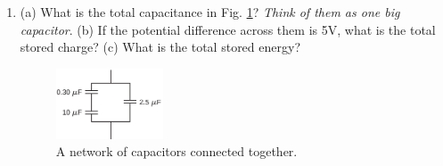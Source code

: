 \documentclass[10pt]{article}
\begin{document}
\begin{enumerate}
\item (a) What is the total capacitance in Fig. \ref{fig:caps1}?  \textit{Think of them as one big capacitor}. (b) If the potential difference across them is 5V, what is the total stored charge? (c) What is the total stored energy? 
\begin{figure}[hb]
\centering
\includegraphics[width=0.3\textwidth]{caps1.png}
\caption{\label{fig:caps1} A network of capacitors connected together.}
\end{figure}
\end{enumerate}
\end{document}
